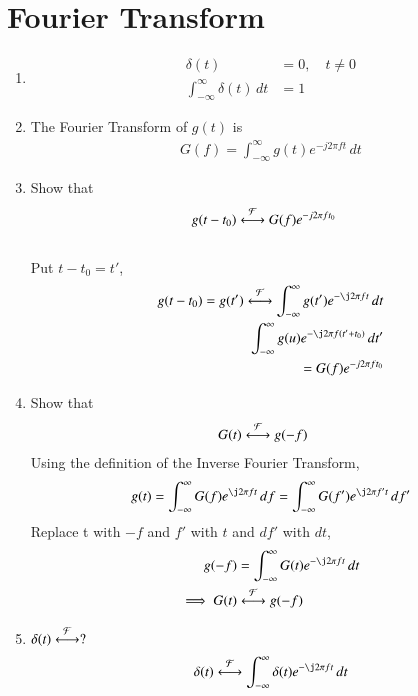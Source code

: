 \documentclass[journal,12pt,twocolumn]{IEEEtran}
\renewcommand\thesection{\arabic{section}}
\begin{document}
\section{Fourier Transform}

 

\begin{enumerate}[label=\thesection.\arabic*
,ref=\thesection.\theenumi]
\item 
	\begin{align}
		\delta(t)&=0, \quad t\neq0
\\
		\int_{-\infty}^{\infty}\delta(t) \, dt&= 1
	\end{align}
 \item The Fourier Transform of $g(t)$ is
 \begin{align}
 G(f)=\int_{-\infty}^{\infty}g(t)e^{-j2\pi ft}\,dt
 \end{align}
 \item Show that 
 \begin{align}
	 g(t-t_0)&\overset{\mathcal{F}}{ \longleftrightarrow}G(f)e^{-j2\pi ft_0}
 \end{align}
\solution\\
Put $t-t_0 = t'$,
\begin{align}
	g(t-t_0) = g(t')\system{F}\int_{-\infty}^{\infty} g(t')e^{-\j2\pi ft}\,dt \\
	\int_{-\infty}^{\infty}	g(u)e^{-\j2\pi f(t' + t_0)}\,dt' \\
	=G(f)e^{-j2\pi ft_0}
\end{align}
 \item Show that 
 \begin{align}
	 G(t)&\overset{\mathcal{F}}{ \longleftrightarrow}g(-f)
 \end{align}
\solution Using the definition of the Inverse Fourier Transform,
\begin{align}
	g(t)=\int_{-\infty}^{\infty}G(f)e^{\j2\pi ft}\,df
	=\int_{-\infty}^{\infty}G(f')e^{\j2\pi f't}\,df'
	\label{eq:duality}
\end{align}
Replace t with $-f$ and $f'$ with $t$ and $df'$ with $dt$,
\begin{align}
	g(-f)&=\int_{-\infty}^{\infty}G(t)e^{-\j2\pi ft}\,dt \\
	\implies G(t)&\system{F}g(-f)
	\label{eq:duality}
\end{align}
\item $\delta(t)\overset{\mathcal{F}}{ \longleftrightarrow}?$\\
\solution
\begin{align}
	\delta(t)\system{F}\int_{-\infty}^{\infty}\delta(t)e^{-\j2\pi ft}\, dt \\

\end{align}
\end{enumerate}
\end{document}
